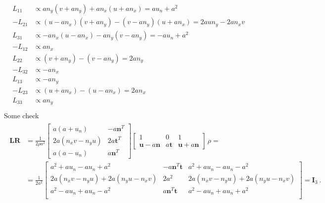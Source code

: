 \documentclass[letterpaper,10pt,english]{jupyterBook}
\begin{document}
\begin{equation*}
\begin{split}\begin{aligned}
   L_{11} & \propto  a n_y (v+a n_y) + a n_x (u+a n_x) = a u_n + a^2   \\ 
  -L_{21} & \propto (u-a n_x)(v+a n_y) - (v-a n_y) (u+a n_x) = 2 a u n_y - 2 a n_x v   \\ 
   L_{31} & \propto -a n_x (u-a n_x) - a n_y (v- a n_y) = - a u_n + a^2  \\ 
  -L_{12} & \propto a n_x \\ 
   L_{22} & \propto ( v+ a n_y) - (v - a n_y) = 2 a n_y   \\ 
  -L_{32} & \propto - a n_x   \\ 
   L_{13} & \propto - a n_y   \\ 
  -L_{23} & \propto ( u + a n_x ) - ( u - a n_x ) = 2 a n_x  \\ 
   L_{33} & \propto a n_y   \\ 
\end{aligned}\end{split}
\end{equation*}
\sphinxAtStartPar
Some check
\begin{equation*}
\begin{split}\begin{aligned}
  \mathbf{L} \mathbf{R} 
  & = \frac{1}{2 \rho a^2} \begin{bmatrix} a ( a + u_n) & - a \mathbf{n}^T \\ 2 a (n_x v - n_y u) & 2 a \mathbf{t}^T \\ a ( a - u_n ) & a \mathbf{n}^T \end{bmatrix} \begin{bmatrix} 1 & 0 & 1 \\ \mathbf{u} - a \mathbf{n} & a \mathbf{t} & \mathbf{u} + a \mathbf{n} \end{bmatrix} \, \rho = \\
  & = \frac{1}{2 a^2} \begin{bmatrix}
  a^2 + a u_n - a u_n + a^2 & - a\mathbf{n}^T\mathbf{t} &  a^2 + a u_n - a u_n - a^2 \\
  2 a ( n_x v - n_y u ) + 2 a ( n_y u - n_x v ) & 2 a^2 &  2 a ( n_x v - n_y u ) + 2 a ( n_y u - n_x v ) \\
  a^2 - a u_n + a u_n - a^2 &   a\mathbf{n}^T\mathbf{t} &  a^2 - a u_n + a u_n + a^2 \\
  \end{bmatrix} = \mathbf{I}_3 \ .
\end{aligned}\end{split}
\end{equation*}
\end{document}

